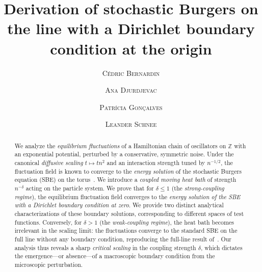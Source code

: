 \documentclass[a4paper, reqno, 12pt]{amsart}
\title[SBE on the line with a Dirichlet BC at the origin]{Derivation of stochastic Burgers on the line with  a Dirichlet boundary condition at the origin}
\author[Bernardin]{\textsc{C\'edric Bernardin}}
\author[Djurdjevac]{\textsc{Ana Djurdjevac}}
\author[Gon\c{c}alves]{\textsc{Patr\'icia Gon\c{c}alves}}
\author[Schnee]{\textsc{Leander Schnee}}
\date{}
\theoremstyle{plain}
\theoremstyle{definition}
\begin{document}
\begin{abstract}
We analyze the \emph{equilibrium fluctuations} of a Hamiltonian chain of oscillators on \(\mathbb{Z}\) with an exponential potential, perturbed by a conservative, symmetric noise. Under the canonical \emph{diffusive scaling} \(t \mapsto t n^2\) and an interaction strength tuned by \(n^{-1/2}\), the fluctuation field is known to converge to the \emph{energy solution} of the stochastic Burgers equation (SBE) on the torus~\cite{ABGS22}. We introduce a \emph{coupled moving heat bath} of strength \(n^{-\delta}\) acting on the particle system. We prove that for \(\delta \leq 1\) (the \emph{strong-coupling regime}), the equilibrium fluctuation field converges to the \emph{energy solution of the SBE with a Dirichlet boundary condition at zero}. We provide two distinct analytical characterizations of these boundary solutions, corresponding to different spaces of test functions. Conversely, for \(\delta > 1\) (the \emph{weak-coupling regime}), the heat bath becomes irrelevant in the scaling limit: the fluctuations converge to the standard SBE on the full line without any boundary condition, reproducing the full-line result of~\cite{GJ14}. Our analysis thus reveals a sharp \emph{critical scaling} in the coupling strength \(\delta\), which dictates the emergence---or absence---of a macroscopic boundary condition from the microscopic perturbation.
\end{abstract}

\medskip

\keywords{}
\renewcommand{\subjclassname}{%
  \textup{2010} Mathematics Subject Classification}
\maketitle
\end{document}
